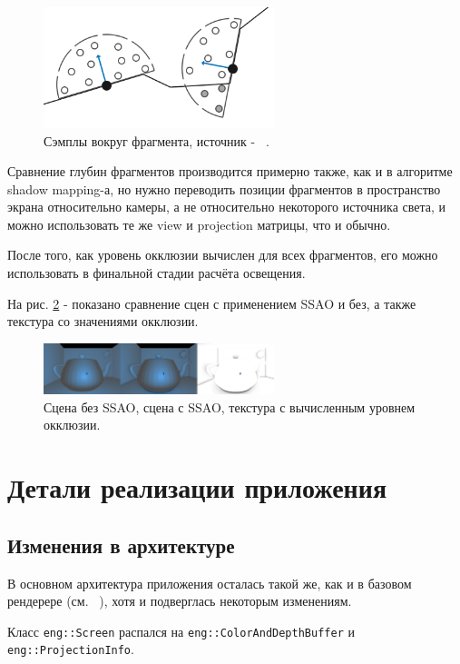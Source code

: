 \documentclass[14pt]{extarticle}
\begin{document}
\begin{figure}
	\label{fig:ssao}
	\caption{Сэмплы вокруг фрагмента, источник - ~\cite{ssao}.}
	\includegraphics[width=0.6\textwidth]{ssao_theory.png}
\end{figure}


Сравнение глубин фрагментов производится примерно также, как и в алгоритме shadow mapping-а, но нужно переводить позиции фрагментов в пространство экрана относительно камеры, а не относительно некоторого источника света, и можно использовать те же view и projection матрицы, что и обычно. 

После того, как уровень окклюзии вычислен для всех фрагментов, его можно использовать в финальной стадии расчёта освещения.

На рис. \ref{fig:ssao2} - показано сравнение сцен с применением SSAO и без, а также текстура со значениями окклюзии.

\begin{figure}
	\label{fig:ssao2}
	\caption{Сцена без SSAO, сцена с SSAO, текстура с вычисленным уровнем окклюзии.}
	\includegraphics[width=0.6\textwidth]{ssao.png}
\end{figure}

\section{Детали реализации приложения}
\subsection{Изменения в архитектуре}
В основном архитектура приложения осталась такой же, как и в базовом рендерере (см. ~\cite{year2paper}), хотя и подверглась некоторым изменениям.

Класс \texttt{eng::Screen} распался на \texttt{eng::ColorAndDepthBuffer} и \texttt{eng::ProjectionInfo}.
\end{document}
